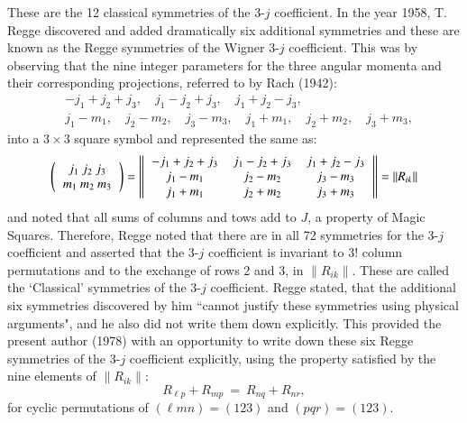 These are the 12 classical symmetries of the 3-$j$ coefficient. In the year 1958, T. Regge discovered and added dramatically six additional symmetries and these are known as the Regge symmetries of the Wigner 3-$j$ coefficient. This was by observing that the nine integer parameters for the three angular momenta and their corresponding projections, referred to by Rach (1942):
\begin{equation}
\begin{split}
& -j_1+j_2+j_3, \quad  j_1-j_2+j_3, \quad j_1+j_2-j_3,\\
& j_1-m_1,\quad j_2-m_2,\quad j_3-m_3,\quad j_1+m_1,\quad j_2+m_2,\quad j_3+m_3,\label{chap29-eq10}
\end{split}
\end{equation}
into a $3\times 3$ square symbol and represented the same as:
\begin{equation}
\left(
\begin{tabular}{ccc}
$j_1\ j_2\ j_3$\\ 
$m_1\ m_2\ m_3$\\ 
\end{tabular} 
\right) 
= \left\| 
\begin{tabular}{ccc}
$-j_1+j_2+j_3$ & $j_1-j_2+j_3$ &  $j_1+j_2-j_3$\\
$j_1-m_1$ & $j_2-m_2$ & $j_3-m_3$\\
$j_1+m_1$ & $j_2+m_2$ & $j_3+m_3$\\
\end{tabular} 
\right\|
=\|R_{ik}\| \label{chap29-eq11}
\end{equation}
and noted that all sums of columns and tows add to $J$, a property of Magic Squares. Therefore, Regge noted that there are in all 72 symmetries for the 3-$j$ coefficient and asserted that the 3-$j$ coefficient is invariant to 3! column permutations and to the exchange of rows 2 and 3, in $\|R_{ik}\|$. These are called the `Classical' symmetries of the 3-$j$ coefficient. Regge stated, that the additional six symmetries discovered by him ``cannot justify these symmetries using physical arguments", and he also did not write them down explicitly. This provided the present author (1978) with an opportunity to write down these six Regge symmetries of the 3-$j$ coefficient explicitly, using the property satisfied by the nine elements of $\|R_{ik}\|$:
\begin{equation}
R_{\ell p} + R_{mp}\ =\ R_{nq} + R_{nr},\label{chap29-eq12}
\end{equation}
for cyclic permutations of $(\ell mn)=(123)$ and $(pqr)=(123)$. 

